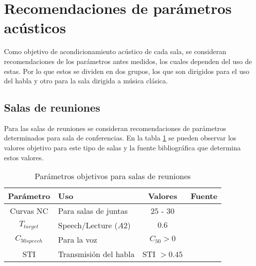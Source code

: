 \section{Recomendaciones de parámetros acústicos} \label{secc: Recomendaciones}
Como objetivo de acondicionamiento acústico de cada sala, se consideran recomendaciones de los parámetros antes medidos, los cuales dependen del uso de estas. Por lo que estos se dividen en dos grupos, los que son dirigidos para el uso del habla y otro para la sala dirigida a música clásica.
\subsection{Salas de reuniones}
Para las salas de reuniones se consideran recomendaciones de parámetros determinados para sala de conferencias. En la tabla \ref{tab: parametros objetivos sala de reuniones} se pueden observar los valores objetivo para este tipo de salas y la fuente bibliográfica que determina estos valores.
\begin{table}[H]
    \centering
    \begin{tabular}{|c|l|c|l|}
    \hline
    \textbf{Parámetro} & \textbf{Uso }            & \textbf{Valores}    & \textbf{Fuente}  \\ \hline
    Curvas NC          & Para salas de juntas     & $25$ - $30$         & \cite{Recuero} \\ \hline
    $T_{target}$       & Speech/Lecture ($A2$)      & $0.6$               & \cite{DIN18041} \\ \hline
    $C_{50speech}$           & Para la voz              &  $C_{50}>0$         & \cite{marshall1994}  \\ \hline  
    STI & Transmisión del habla & STI $>0.45$ & \cite{ISO9921}\\ \hline
    \end{tabular}
    \caption{Parámetros objetivos para salas de reuniones}
    \label{tab: parametros objetivos sala de reuniones}
\end{table}
